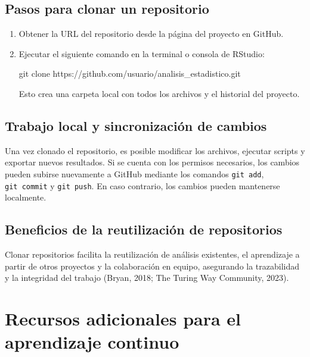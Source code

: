 \documentclass[
  spanish,
  a4paper,
  DIV=11,
  numbers=noendperiod,
  onepage,
  openany]{scrreprt}
\newenvironment{Shaded}{\begin{snugshade}}{\end{snugshade}}
\newcommand{\ErrorTok}[1]{\textcolor[rgb]{0.68,0.00,0.00}{#1}}
\newcommand{\NormalTok}[1]{\textcolor[rgb]{0.00,0.23,0.31}{#1}}
\newcommand{\SpecialCharTok}[1]{\textcolor[rgb]{0.37,0.37,0.37}{#1}}
\begin{document}
\subsection{Pasos para clonar un
repositorio}\label{pasos-para-clonar-un-repositorio}

\begin{enumerate}
\def\labelenumi{\arabic{enumi}.}
\item
  Obtener la URL del repositorio desde la página del proyecto en GitHub.
\item
  Ejecutar el siguiente comando en la terminal o consola de RStudio:

\begin{Shaded}
\begin{Highlighting}[]
\NormalTok{git clone https}\SpecialCharTok{:}\ErrorTok{//}\NormalTok{github.com}\SpecialCharTok{/}\NormalTok{usuario}\SpecialCharTok{/}\NormalTok{analisis\_estadistico.git}
\end{Highlighting}
\end{Shaded}

  Esto crea una carpeta local con todos los archivos y el historial del
  proyecto.
\end{enumerate}

\subsection{Trabajo local y sincronización de
cambios}\label{trabajo-local-y-sincronizaciuxf3n-de-cambios}

Una vez clonado el repositorio, es posible modificar los archivos,
ejecutar scripts y exportar nuevos resultados. Si se cuenta con los
permisos necesarios, los cambios pueden subirse nuevamente a GitHub
mediante los comandos \texttt{git\ add}, \texttt{git\ commit} y
\texttt{git\ push}. En caso contrario, los cambios pueden mantenerse
localmente.

\subsection{Beneficios de la reutilización de
repositorios}\label{beneficios-de-la-reutilizaciuxf3n-de-repositorios}

Clonar repositorios facilita la reutilización de análisis existentes, el
aprendizaje a partir de otros proyectos y la colaboración en equipo,
asegurando la trazabilidad y la integridad del trabajo (Bryan, 2018; The
Turing Way Community, 2023).

\section{Recursos adicionales para el aprendizaje
continuo}\label{recursos-adicionales-para-el-aprendizaje-continuo}
\end{document}
